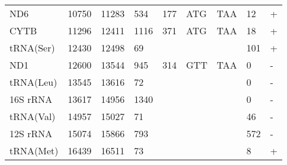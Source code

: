 \documentclass[../DISSERTACAO_MAIN.tex]{subfiles}
\begin{document}
\begin{longtable}{llllllllllllllllllllll}
			ND6          & 10750          & \multicolumn{2}{l}{11283} & \multicolumn{2}{l}{534}        & \multicolumn{3}{l}{177}                       & \multicolumn{3}{l}{ATG}           & \multicolumn{3}{l}{TAA}   & \multicolumn{3}{l}{12}          & \multicolumn{4}{l}{+}                  \\
			CYTB         & 11296          & \multicolumn{2}{l}{12411} & \multicolumn{2}{l}{1116}       & \multicolumn{3}{l}{371}                       & \multicolumn{3}{l}{ATG}           & \multicolumn{3}{l}{TAA}   & \multicolumn{3}{l}{18}          & \multicolumn{4}{l}{+}                  \\
			tRNA(Ser)    & 12430          & \multicolumn{2}{l}{12498} & \multicolumn{2}{l}{69}         & \multicolumn{3}{l}{}                          & \multicolumn{3}{l}{}              & \multicolumn{3}{l}{}      & \multicolumn{3}{l}{101}         & \multicolumn{4}{l}{+}                  \\
			ND1          & 12600          & \multicolumn{2}{l}{13544} & \multicolumn{2}{l}{945}        & \multicolumn{3}{l}{314}                       & \multicolumn{3}{l}{GTT}           & \multicolumn{3}{l}{TAA}   & \multicolumn{3}{l}{0}           & \multicolumn{4}{l}{-}                  \\
			tRNA(Leu)    & 13545          & \multicolumn{2}{l}{13616} & \multicolumn{2}{l}{72}         & \multicolumn{3}{l}{}                          & \multicolumn{3}{l}{}              & \multicolumn{3}{l}{}      & \multicolumn{3}{l}{0}           & \multicolumn{4}{l}{-}                  \\
			16S 				rRNA & 13617          & \multicolumn{2}{l}{14956} & \multicolumn{2}{l}{1340}       & \multicolumn{3}{l}{}                          & \multicolumn{3}{l}{}              & \multicolumn{3}{l}{}      & \multicolumn{3}{l}{0}           & \multicolumn{4}{l}{-}                  \\
			tRNA(Val)    & 14957          & \multicolumn{2}{l}{15027} & \multicolumn{2}{l}{71}         & \multicolumn{3}{l}{}                          & \multicolumn{3}{l}{}              & \multicolumn{3}{l}{}      & \multicolumn{3}{l}{46}          & \multicolumn{4}{l}{-}                  \\
			12S 				rRNA & 15074          & \multicolumn{2}{l}{15866} & \multicolumn{2}{l}{793}        & \multicolumn{3}{l}{}                          & \multicolumn{3}{l}{}              & \multicolumn{3}{l}{}      & \multicolumn{3}{l}{572}         & \multicolumn{4}{l}{-}                  \\
			tRNA(Met)    & 16439          & \multicolumn{2}{l}{16511} & \multicolumn{2}{l}{73}         & \multicolumn{3}{l}{}                          & \multicolumn{3}{l}{}              & \multicolumn{3}{l}{}      & \multicolumn{3}{l}{8}           & \multicolumn{4}{l}{+}                  \\

\end{longtable}
\end{document}
